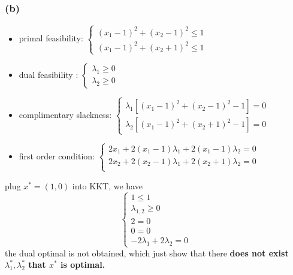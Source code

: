 \documentclass{article}
\begin{document}
\subsubsection*{(b)}
\begin{itemize}
\item primal feasibility: $ \begin{cases}
(x_1 -1)^2 + (x_2-1)^2 \le 1 \\
(x_1 -1)^2 + (x_2+1)^2 \le 1
\end{cases} $
\item dual feasibility : $ \begin{cases}
\lambda_1 \ge 0 \\
\lambda_2 \ge 0 
\end{cases} $
\item complimentary slackness: $ \begin{cases}
\lambda_1 [(x_1 -1)^2 + (x_2 -1)^2 -1] = 0 \\
\lambda_2[(x_1 -1)^2 + (x_2 +1)^2 -1] = 0
\end{cases} $
\item first order condition:  $ \begin{cases}
2x_1 + 2(x_1 -1)\lambda_1 +  2(x_1 -1)\lambda_2= 0 \\
2x_2 + 2(x_2 -1)\lambda_1 +  2(x_2 +1)\lambda_2= 0 \\

\end{cases} $
\end{itemize}
plug $x^* = (1,0)$ into KKT, we have 
\[\begin{cases}
1 \le 1 \\
\lambda_{1,2} \ge 0\\
2 = 0\\
0= 0\\
-2\lambda_1 + 2\lambda_2 = 0
\end{cases}
\]
the dual optimal is not obtained, which just show that there {\bf does not exist $\lambda_1^*, \lambda_2^*$ that $x^*$ is optimal. }
\end{document}
